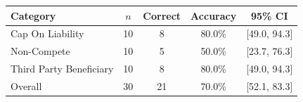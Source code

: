 \begin{tabular}{lcccc}
\toprule
Category & $n$ & Correct & Accuracy & 95\% CI \\
\midrule
Cap On Liability & 10 & 8 & 80.0\% & [49.0, 94.3] \\
Non-Compete & 10 & 5 & 50.0\% & [23.7, 76.3] \\
Third Party Beneficiary & 10 & 8 & 80.0\% & [49.0, 94.3] \\
\midrule
Overall & 30 & 21 & 70.0\% & [52.1, 83.3] \\
\bottomrule
\end{tabular}
